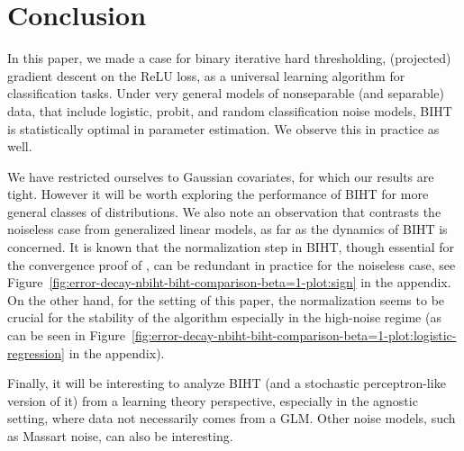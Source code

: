 \section{Conclusion}
In this paper, we  made a case for binary iterative hard thresholding, (projected) gradient descent on the ReLU loss, as a universal learning algorithm for classification tasks. Under very general models of nonseparable (and separable) data, that include logistic, probit, and random classification noise models, BIHT is statistically optimal in parameter estimation. We observe this in practice as well. %

We have restricted ourselves to Gaussian covariates, for which our results are tight. However it will be worth exploring the performance of BIHT for more general classes of distributions. We also note an observation that contrasts the noiseless case from generalized linear models, as far as the dynamics of BIHT is concerned. It is known that the normalization step in BIHT, though essential for the convergence proof of \cite{friedlander2021nbiht,matsumoto2022binary}, can be redundant in practice for the noiseless case, see Figure~\ref{fig:error-decay-nbiht-biht-comparison-beta=1-plot:sign} in the appendix. On the other hand, for the setting of this paper, the normalization seems to be crucial for the stability of the algorithm especially in the high-noise regime (as can be seen in Figure~\ref{fig:error-decay-nbiht-biht-comparison-beta=1-plot:logistic-regression} in the appendix). 

Finally, it will  be interesting to analyze BIHT (and a stochastic perceptron-like version of it) from a learning theory perspective, especially in the agnostic setting, where data not necessarily comes from a GLM. Other noise models, such as Massart noise, can also be interesting. 